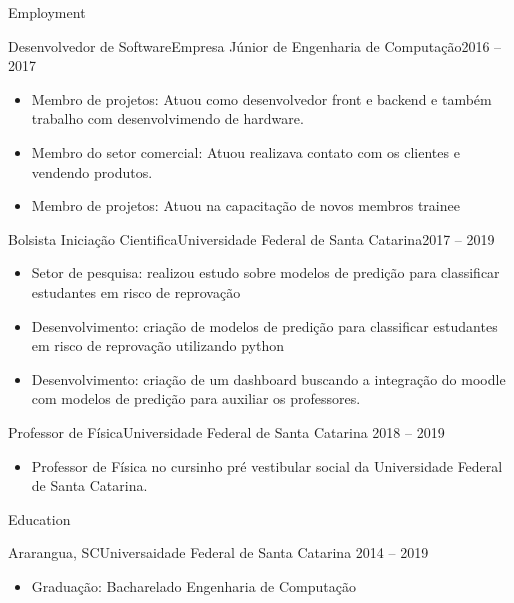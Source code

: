 \documentclass[]{mcdowellcv}
\begin{document}
	\makeheader
	
	\begin{cvsection}{Employment}
		\begin{cvsubsection}{Desenvolvedor de Software}{Empresa Júnior de Engenharia de Computação}{2016 -- 2017}
			~\\
			\begin{itemize}
				\item Membro de projetos: Atuou como desenvolvedor front e backend e também trabalho com desenvolvimendo de hardware.
				\item Membro do setor comercial: Atuou realizava contato com os clientes e vendendo produtos.
				\item Membro de projetos: Atuou na capacitação de novos membros trainee
			\end{itemize}
		\end{cvsubsection}
		
		\begin{cvsubsection}{Bolsista Iniciação Cientifica}{Universidade Federal de Santa Catarina}{2017 -- 2019}
			~\\
			\begin{itemize}
				\item Setor de pesquisa: realizou estudo sobre modelos de predição para classificar estudantes em risco de reprovação
				\item Desenvolvimento: criação de modelos de predição para classificar estudantes em risco de reprovação utilizando python
				\item Desenvolvimento: criação de um dashboard buscando a integração do moodle com modelos de predição para auxiliar os professores.
			\end{itemize}
		\end{cvsubsection}
		
		\begin{cvsubsection}{Professor de Física}{Universidade Federal de Santa Catarina}{ 2018 -- 2019}	
			~\\			
			\begin{itemize}
				\item Professor de Física no cursinho pré vestibular social da Universidade Federal de Santa Catarina.
			\end{itemize}
		\end{cvsubsection}
		
		
	\end{cvsection}
	
	\begin{cvsection}{Education}
		\begin{cvsubsection}{Ararangua, SC}{Universaidade Federal de Santa Catarina}{ 2014 -- 2019}
			~\\
			\begin{itemize}
				\item Graduação: Bacharelado Engenharia de Computação 
			\end{itemize}
		\end{cvsubsection}
	\end{cvsection}
	
\end{document}
